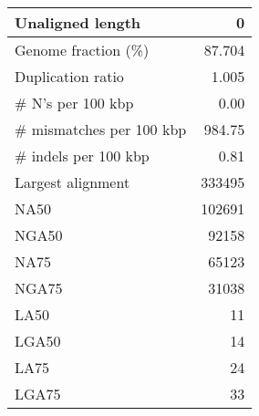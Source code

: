 \documentclass[12pt,a4paper]{article}
\begin{document}
\begin{table}[ht]
\begin{center}
\begin{tabular}{|l*{1}{|r}|}
Unaligned length & 0 \\ \hline
Genome fraction (\%) & 87.704 \\ \hline
Duplication ratio & 1.005 \\ \hline
\# N's per 100 kbp & 0.00 \\ \hline
\# mismatches per 100 kbp & 984.75 \\ \hline
\# indels per 100 kbp & 0.81 \\ \hline
Largest alignment & 333495 \\ \hline
NA50 & 102691 \\ \hline
NGA50 & 92158 \\ \hline
NA75 & 65123 \\ \hline
NGA75 & 31038 \\ \hline
LA50 & 11 \\ \hline
LGA50 & 14 \\ \hline
LA75 & 24 \\ \hline
LGA75 & 33 \\ \hline
\end{tabular}
\end{center}
\end{table}
\end{document}
